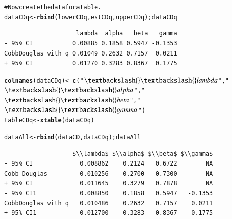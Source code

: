 \documentclass[preprint,authoryear,12pt]{elsarticle}\usepackage{graphicx, color}
\makeatletter
\newcommand{\hlfunctioncall}[1]{\textcolor[rgb]{0.501960784313725,0,0.329411764705882}{\textbf{#1}}}%
\newcommand{\hlstring}[1]{\textcolor[rgb]{0.6,0.6,1}{#1}}%
\newcommand{\hlcomment}[1]{\textcolor[rgb]{0.180392156862745,0.6,0.341176470588235}{#1}}%
\newenvironment{kframe}{%
 \def\at@end@of@kframe{}%
 \ifinner\ifhmode%
  \def\at@end@of@kframe{\end{minipage}}%
  \begin{minipage}{\columnwidth}%
 \fi\fi%
 \def\FrameCommand##1{\hskip\@totalleftmargin \hskip-\fboxsep
 \colorbox{shadecolor}{##1}\hskip-\fboxsep
     \hskip-\linewidth \hskip-\@totalleftmargin \hskip\columnwidth}%
 \MakeFramed {\advance\hsize-\width
   \@totalleftmargin\z@ \linewidth\hsize
   \@setminipage}}%
 {\par\unskip\endMakeFramed%
 \at@end@of@kframe}
\newenvironment{knitrout}{}{} %
\makeatother
\begin{document}
\begin{knitrout}
\begin{kframe}
\begin{alltt}
\hlcomment{# Now create the data for a table.}
dataCDq <- \hlfunctioncall{rbind}(lowerCDq, estCDq, upperCDq); dataCDq
\end{alltt}
\begin{verbatim}
                    lambda  alpha   beta   gamma
- 95% CI           0.00885 0.1858 0.5947 -0.1353
CobbDouglas with q 0.01049 0.2632 0.7157  0.0211
+ 95% CI           0.01270 0.3283 0.8367  0.1775
\end{verbatim}
\begin{alltt}
\hlfunctioncall{colnames}(dataCDq)  <- \hlfunctioncall{c}(\hlstring{"$\textbackslash{}\textbackslash{}lambda$"}, \hlstring{"$\textbackslash{}\textbackslash{}alpha$"}, \hlstring{"$\textbackslash{}\textbackslash{}beta$"}, \hlstring{"$\textbackslash{}\textbackslash{}gamma$"})
tableCDq <- \hlfunctioncall{xtable}(dataCDq)

dataAll <- \hlfunctioncall{rbind}(dataCD, dataCDq); dataAll
\end{alltt}
\begin{verbatim}
                   $\\lambda$ $\\alpha$ $\\beta$ $\\gamma$
- 95% CI             0.008862    0.2124   0.6722        NA
Cobb-Douglas         0.010256    0.2700   0.7300        NA
+ 95% CI             0.011645    0.3279   0.7878        NA
- 95% CI1            0.008850    0.1858   0.5947   -0.1353
CobbDouglas with q   0.010486    0.2632   0.7157    0.0211
+ 95% CI1            0.012700    0.3283   0.8367    0.1775
\end{verbatim}
\end{kframe}
\end{knitrout}
\end{document}
